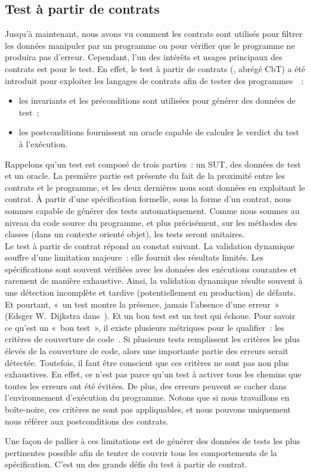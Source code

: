 \subsection{Test à partir de contrats}
\label{subsection:sota:cbt}

Jusqu'à maintenant, nous avons vu comment les contrats sont utilisés pour
{\strong filtrer} les données manipuler par un programme ou pour vérifier que le
programme ne produira pas d'erreur. Cependant, l'un des intérêts et usages
principaux des contrats est pour le {\strong test}. En effet, le {\strong test à
partir de contrats} (, abrégé CbT) a été
introduit pour exploiter les langages de contrats afin de tester des
programmes~~:

\begin{itemize}

\item les invariants et les préconditions sont utilisées pour {\strong générer
des données} de test~;

\item les postconditions {\strong fournissent un oracle} capable de calculer le
verdict du test à l'exécution.

\end{itemize}

Rappelons qu'un test est composé de trois parties~: un SUT, des données de test
et un oracle. La première partie est présente du fait de la proximité entre les
contrats et le programme, et les deux dernières nous sont données en exploitant
le contrat. À partir d'une spécification formelle, sous la forme d'un contrat,
nous sommes capable de générer des tests automatiquement. Comme nous sommes au
niveau du code source du programme, et plus précisément, sur les méthodes des
classes (dans un contexte orienté objet), les tests seront {\strong unitaires}. \\

Le test à partir de contrat répond au constat suivant. La validation dynamique
souffre d'une limitation majeure~: elle fournit des résultats limités. Les
spécifications sont souvent vérifiées avec les données des exécutions courantes
et rarement de manière exhaustive. Ainsi, la validation dynamique résulte
souvent à une détection incomplète et tardive (potentiellement en production) de
défauts. Et pourtant, «~un test montre la présence, jamais l'absence d'une
erreur~» (Edsger W.~Dijkstra dans~). Et un bon test est un test
qui échoue.  Pour savoir ce qu'est un «~bon test~», il existe plusieurs
métriques pour le qualifier~: les critères de couverture de
code~. Si plusieurs tests remplissent
les critères les plus élevés de la couverture de code, alors une importante
partie des erreurs serait détectée. Toutefois, il faut être conscient que ces
critères ne sont pas non plus exhaustives. En effet, ce n'est pas parce qu'un
test à activer tous les chemins que toutes les erreurs ont été évitées. De plus,
des erreurs peuvent se cacher dans l'environnement d'exécution du programme.
Notons que si nous travaillons en boîte-noire, ces critères ne sont pas
appliquables, et nous pouvons uniquement nous référer aux postconditions des
contrats.

Une façon de pallier à ces limitations est de générer des données de tests les
plus pertinentes possible afin de tenter de couvrir tous les comportements de la
spécification. C'est un des grands défis du test à partir de contrat.

